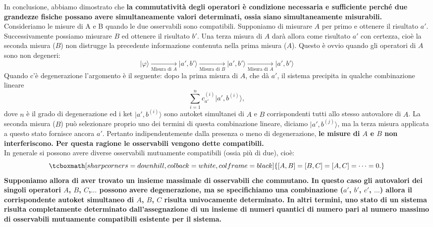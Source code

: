 \documentclass[a4paper,12pt,oneside]{book}
\begin{document}
In conclusione, abbiamo dimostrato che \textbf{la commutatività degli operatori è condizione necessaria e sufficiente perché due grandezze fisiche possano avere simultaneamente valori determinati, ossia siano simultaneamente misurabili.}\\

Consideriamo le misure di A e B quando le due osservabili sono compatibili. Supponiamo di misurare $A$ per primo e ottenere il risultato $a'$. Successivamente possiamo misurare $B$ ed ottenere il risultato $b'$. Una terza misura di $A$ darà allora come risultato $a'$ con certezza, cioè la seconda misura ($B$) non distrugge la precedente informazione contenuta nella prima misura ($A$). Questo è ovvio quando gli operatori di $A$ sono non degeneri:
	\begin{equation}
		\vert \varphi \rangle \xrightarrow[\textrm{Misura di }A]{ } \vert a',b' \rangle \xrightarrow[\textrm{Misura di }B]{ } \vert a',b' \rangle \xrightarrow[\textrm{Misura di }A]{ } \vert a',b' \rangle  
	\end{equation}
Quando c'è degenerazione l'argomento  è il seguente: dopo la prima misura di $A$, che dà $a'$, il sistema precipita in qualche combinazione lineare
	\begin{equation}
		\sum _{i=1} ^n c_{a'} ^{(i)} \vert a', b^{(i)} \rangle ,
	\end{equation}
dove $n$ è il grado di degenerazione ed i ket $\vert a', b^{(i)} \rangle $ sono autoket simultanei di $A$ e $B$ corrispondenti tutti allo stesso autovalore di $A$. La seconda misura ($B$) può selezionare proprio uno dei termini di questa combinazione lineare, diciamo $\vert a', b^{(j)} \rangle $, ma la terza misura applicata a questo stato fornisce ancora $a'$. Pertanto indipendentemente dalla presenza o meno di degenerazione, \textbf{le misure di $A$ e $B$ non interferiscono. Per questa ragione le osservabili vengono dette compatibili.}\\

In generale si possono avere diverse osservabili mutuamente compatibili (ossia più di due), cioè:
	\begin{equation}
		\tcboxmath[sharp corners=downhill, colback=white, colframe=black]{
			\left[A,B\right]=\left[B,C\right]=\left[A,C\right]=\dots =0.
			}
	\end{equation}
\textbf{Supponiamo allora di aver trovato un insieme massimale di osservabili che commutano. In questo caso gli autovalori dei singoli operatori $A$, $B$, $C$,$\dots$ possono avere degenerazione, ma se specifichiamo una combinazione ($a'$, $b'$, $c'$, $\dots$) allora il corrispondente autoket simultaneo di $A$, $B$, $C$ risulta univocamente determinato. In altri termini, uno stato di un sistema risulta completamente determinato dall'assegnazione di un insieme di numeri quantici di numero pari al numero massimo di osservabili mutuamente compatibili esistente per il sistema.}
\end{document}
